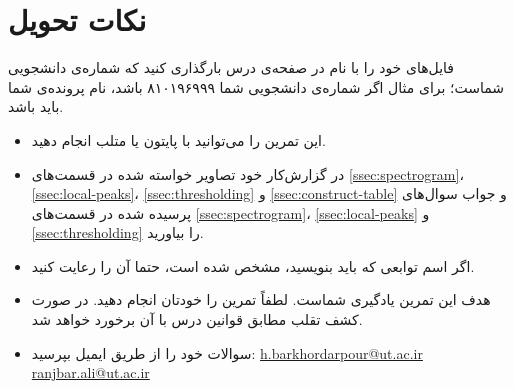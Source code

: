 \documentclass{utsignal}
\begin{document}
	\section*{نکات تحویل}
	فایل‌های خود را با نام  در صفحه‌ی  درس بارگذاری کنید که  شماره‌ی دانشجویی شماست؛ برای مثال اگر شماره‌ی دانشجویی شما ۸۱۰۱۹۶۹۹۹ باشد، نام پرونده‌ی شما باید  باشد.
	\begin{itemize}
		\item این تمرین را می‌توانید با پایتون یا متلب انجام دهید.
		\item در گزارش‌کار خود تصاویر خواسته شده در قسمت‌های \ref{ssec:spectrogram}، \ref{ssec:local-peaks}، \ref{ssec:thresholding} و \ref{ssec:construct-table} و جواب سوال‌های پرسیده شده در قسمت‌های \ref{ssec:spectrogram}، \ref{ssec:local-peaks} و \ref{ssec:thresholding} را بیاورید.
		\item اگر اسم توابعی که باید بنویسید، مشخص شده است، حتما آن را رعایت کنید.
		\item هدف این تمرین یادگیری شماست. لطفاً تمرین را خودتان انجام دهید. در صورت کشف تقلب مطابق قوانین درس با آن برخورد خواهد شد.
		\item سوالات خود را از طریق ایمیل بپرسید:
		\subitem \href{mailto:h.barkhordarpour@ut.ac.ir?subject=[SS\%20S98 A2]}{h.barkhordarpour@ut.ac.ir}
		\subitem \href{mailto:ranjbar.ali@ut.ac.ir?subject=[SS\%20S98 A2]}{ranjbar.ali@ut.ac.ir}
	\end{itemize}
\end{document}
